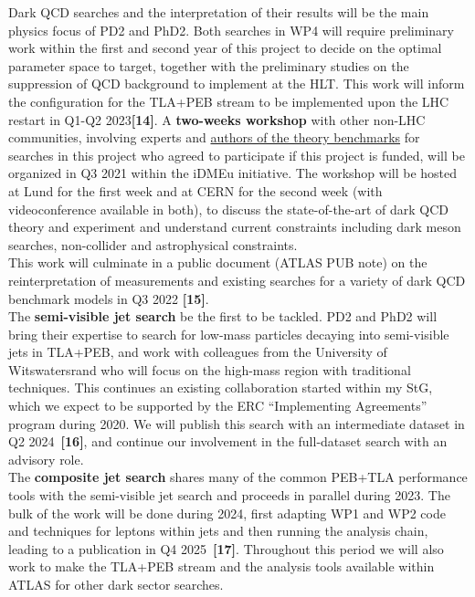Dark QCD searches and the interpretation of their results will be the main physics focus of PD2 and PhD2. 
Both searches in WP4 will require preliminary work within the first and second year of this project to decide on the optimal parameter space to target, 
together with the preliminary studies on the suppression of QCD background to implement at the HLT.
This work will inform the configuration for the TLA+PEB stream to be implemented upon the LHC restart in Q1-Q2 2023\textbf{[14]}. 
A \textbf{two-weeks workshop} with other non-LHC communities, involving experts and \href{https://p3h.particle.kit.edu/research/projects/b3a}{authors of the theory benchmarks} for searches in this project who agreed to participate if this project is funded, will be organized in Q3 2021 within the iDMEu initiative. 
The workshop will be hosted at Lund for the first week and at CERN for the second week (with videoconference available in both), to discuss the state-of-the-art of dark QCD theory and experiment and understand current constraints including dark meson searches, non-collider and astrophysical constraints. \\
This work will culminate in a public document (ATLAS PUB note) on the reinterpretation of measurements and existing searches for a variety of dark QCD benchmark models in Q3 2022 \textbf{[15]}. \\
The \textbf{semi-visible jet search} be the first to be tackled.
PD2 and PhD2 will bring their expertise to search for low-mass particles decaying into semi-visible jets in TLA+PEB, and work with colleagues from the University of Witswatersrand who will focus on the high-mass region with traditional techniques. 
This continues an existing collaboration started within my StG, which we expect to be supported by the ERC ``Implementing Agreements'' program during 2020.
We will publish this search with an intermediate dataset in Q2 2024~\textbf{[16]}, and continue our involvement in the full-dataset search with an advisory role. \\
The \textbf{composite jet search} shares many of the common PEB+TLA performance tools with the semi-visible jet search and proceeds in parallel during 2023. 
The bulk of the work will be done during 2024, first adapting WP1 and WP2 code and techniques for leptons within jets and then running the analysis chain, leading to a publication in Q4 2025~\textbf{[17]}. 
Throughout this period we will also work to make the TLA+PEB stream and the analysis tools available within ATLAS for other dark sector searches. 

